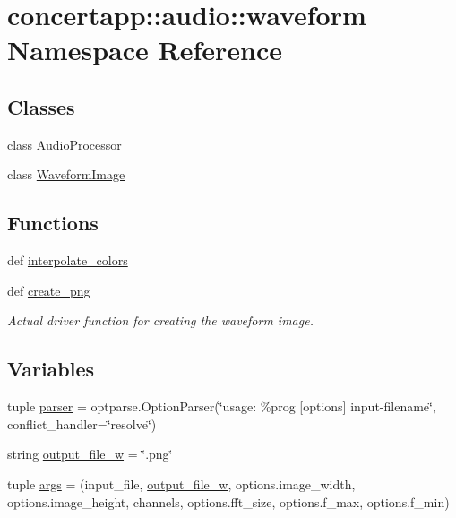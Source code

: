 \hypertarget{namespaceconcertapp_1_1audio_1_1waveform}{
\section{concertapp::audio::waveform Namespace Reference}
\label{namespaceconcertapp_1_1audio_1_1waveform}
}
\subsection*{Classes}
\begin{DoxyCompactItemize}
\item 
class \hyperlink{classconcertapp_1_1audio_1_1waveform_1_1_audio_processor}{AudioProcessor}
\item 
class \hyperlink{classconcertapp_1_1audio_1_1waveform_1_1_waveform_image}{WaveformImage}
\end{DoxyCompactItemize}
\subsection*{Functions}
\begin{DoxyCompactItemize}
\item 
def \hyperlink{namespaceconcertapp_1_1audio_1_1waveform_a6523a6c108b5e8711ad774d20439c9f4}{interpolate\_\-colors}
\item 
def \hyperlink{namespaceconcertapp_1_1audio_1_1waveform_a6c6244591b735c45a7fd25d1b8169ce1}{create\_\-png}
\begin{DoxyCompactList}\small\item\em Actual driver function for creating the waveform image. \item\end{DoxyCompactList}\end{DoxyCompactItemize}
\subsection*{Variables}
\begin{DoxyCompactItemize}
\item 
tuple \hyperlink{namespaceconcertapp_1_1audio_1_1waveform_a02aa23f6042070992773f1489e2f888b}{parser} = optparse.OptionParser(\char`\"{}usage: \%prog \mbox{[}options\mbox{]} input-\/filename\char`\"{}, conflict\_\-handler=\char`\"{}resolve\char`\"{})
\item 
string \hyperlink{namespaceconcertapp_1_1audio_1_1waveform_a92ef9ae366b0cdb6411aa777bed829f4}{output\_\-file\_\-w} = \char`\"{}.png\char`\"{}
\item 
tuple \hyperlink{namespaceconcertapp_1_1audio_1_1waveform_a1e362a69de95f23ed1e9f30988ed1ed0}{args} = (input\_\-file, \hyperlink{namespaceconcertapp_1_1audio_1_1waveform_a92ef9ae366b0cdb6411aa777bed829f4}{output\_\-file\_\-w}, options.image\_\-width, options.image\_\-height, channels, options.fft\_\-size, options.f\_\-max, options.f\_\-min)
\end{DoxyCompactItemize}


